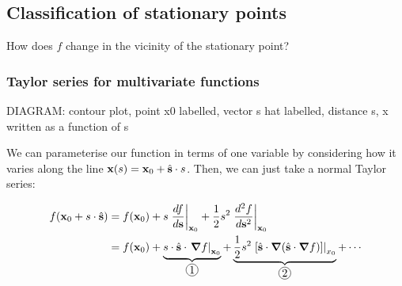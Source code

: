 \documentclass{../template/note}
\begin{document}
    \subsection{Classification of stationary points}

    How does \(f\) change in the vicinity of the stationary point?

    \subsubsection{Taylor series for multivariate functions}

    DIAGRAM: contour plot, point x0 labelled, vector s hat labelled, distance s, x written as a function of s

    We can parameterise our function in terms of one variable by considering how it varies along the line \(\vec x(s) = \vec x_0 + \hvec s \cdot s\). Then, we can just take a normal Taylor series:

    \begin{align*}
        f(\vec x_0 + s \cdot \hvec s) &= f(\vec x_0) + s\left.\frac{df}{d \vec s}\right|_{\vec x_0} + \frac{1}{2}s^2 \left.\frac{d^2f}{d\vec s^2}\right|_{\vec x_0} \\
        &= f(\vec x_0) + \underbrace{s \cdot \hvec s \cdot \left.\grad f\right|_{\vec x_0}}_{\circled 1} + \underbrace{\frac{1}{2}s^2 \left.[\hvec s \cdot \grad(\hvec s \cdot \grad f)]\right|_{x_0}}_{\circled 2} + \cdots
    \end{align*}
    
\end{document}
